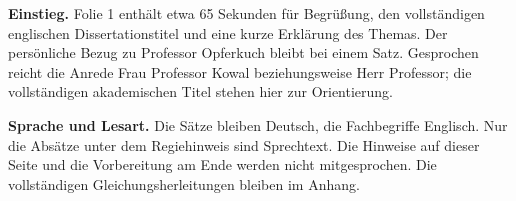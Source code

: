 \documentclass[11pt,a4paper]{article}
\begin{document}
\textbf{Einstieg.} Folie 1 enthält etwa 65 Sekunden für Begrüßung, den
vollständigen englischen Dissertationstitel und eine kurze Erklärung des Themas.
Der persönliche Bezug zu Professor Opferkuch bleibt bei einem Satz.
Gesprochen reicht die Anrede \glqq Frau Professor Kowal\grqq{} beziehungsweise
\glqq Herr Professor\grqq{}; die vollständigen akademischen Titel stehen hier
zur Orientierung.

\textbf{Sprache und Lesart.} Die Sätze bleiben Deutsch, die Fachbegriffe
Englisch. Nur die Absätze unter dem Regiehinweis sind Sprechtext.
Die Hinweise auf dieser Seite und die Vorbereitung am Ende werden nicht
mitgesprochen. Die vollständigen Gleichungsherleitungen bleiben im Anhang.




\end{document}
